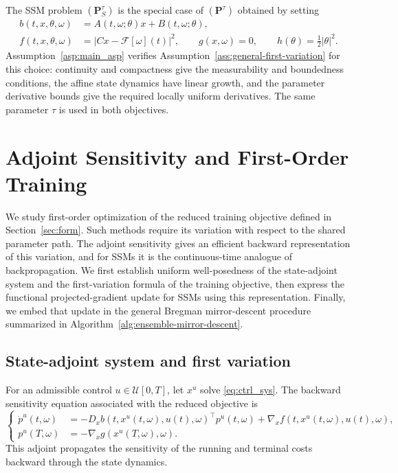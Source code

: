 \documentclass[11pt]{amsart}
\numberwithin{equation}{section} %
\theoremstyle{remark}
\begin{document}
The SSM problem $(\mathbf P_S^\tau)$ is the special case of
$(\mathbf P^\tau)$ obtained by setting
\begin{align}
\label{eq:ssm-regularizer-identification}
    b(t,x,\theta,\omega)&=A(t,\omega;\theta)x+B(t,\omega;\theta),\\
    f(t,x,\theta,\omega)&=|Cx-\mathcal F[\omega](t)|^2, \qquad g(x,\omega)=0,\qquad h(\theta)=\frac12|\theta|^2.\nonumber
\end{align}
Assumption~\ref{asp:main_asp} verifies
Assumption~\ref{ass:general-first-variation} for this choice: continuity
and compactness give the measurability and boundedness conditions, the
affine state dynamics have linear growth, and the parameter derivative
bounds give the required locally uniform derivatives. The same parameter
$\tau$ is used in both objectives.


\section{Adjoint Sensitivity and First-Order Training}
\label{sec:adjoint-mirror}

We study first-order optimization of the reduced training objective defined in Section~\ref{sec:form}. Such methods require its variation with respect to the shared parameter path. The adjoint sensitivity gives an efficient backward representation of this variation, and for SSMs it is the continuous-time analogue of backpropagation. We first establish uniform well-posedness of the state-adjoint system and the first-variation formula of the training objective, then express the functional projected-gradient update for SSMs using this representation. Finally, we embed that update in the general Bregman mirror-descent procedure summarized in Algorithm~\ref{alg:ensemble-mirror-descent}.

\subsection{State-adjoint system and first variation}
\label{sec:first-variation}

For an admissible control $u\in\mathcal U[0,T]$, let $x^u$ solve
\eqref{eq:ctrl_sys}. The backward sensitivity equation associated with
the reduced objective is
\begin{equation}
\label{eq:general-adjoint}
\left\{\begin{aligned}
\dot p^u(t,\omega)
&=-D_x b(t,x^u(t,\omega),u(t),\omega)^\top p^u(t,\omega)
  +\nabla_xf(t,x^u(t,\omega),u(t),\omega),\\
p^u(T,\omega)&=-\nabla_xg(x^u(T,\omega),\omega).
\end{aligned}\right.
\end{equation}
This adjoint propagates the sensitivity of the running and terminal costs backward through the state dynamics.
\end{document}
